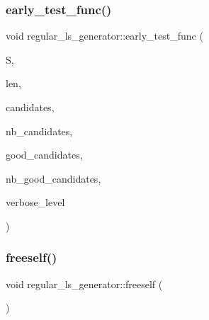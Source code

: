 \subsubsection{\texorpdfstring{early\+\_\+test\+\_\+func()}{early\_test\_func()}}
{\footnotesize\ttfamily void regular\+\_\+ls\+\_\+generator\+::early\+\_\+test\+\_\+func (\begin{DoxyParamCaption}\item[{\mbox{\hyperlink{galois_8h_a09fddde158a3a20bd2dcadb609de11dc}{I\+NT}} $\ast$}]{S,  }\item[{\mbox{\hyperlink{galois_8h_a09fddde158a3a20bd2dcadb609de11dc}{I\+NT}}}]{len,  }\item[{\mbox{\hyperlink{galois_8h_a09fddde158a3a20bd2dcadb609de11dc}{I\+NT}} $\ast$}]{candidates,  }\item[{\mbox{\hyperlink{galois_8h_a09fddde158a3a20bd2dcadb609de11dc}{I\+NT}}}]{nb\+\_\+candidates,  }\item[{\mbox{\hyperlink{galois_8h_a09fddde158a3a20bd2dcadb609de11dc}{I\+NT}} $\ast$}]{good\+\_\+candidates,  }\item[{\mbox{\hyperlink{galois_8h_a09fddde158a3a20bd2dcadb609de11dc}{I\+NT}} \&}]{nb\+\_\+good\+\_\+candidates,  }\item[{\mbox{\hyperlink{galois_8h_a09fddde158a3a20bd2dcadb609de11dc}{I\+NT}}}]{verbose\+\_\+level }\end{DoxyParamCaption})}

\mbox{\label{classregular__ls__generator_afb4921511c596c2fc97e981217701be4}} 
\subsubsection{\texorpdfstring{freeself()}{freeself()}}
{\footnotesize\ttfamily void regular\+\_\+ls\+\_\+generator\+::freeself (\begin{DoxyParamCaption}{ }\end{DoxyParamCaption})}

\mbox{\label{classregular__ls__generator_a376756328833fe79990f30dd77f66b38}} 

